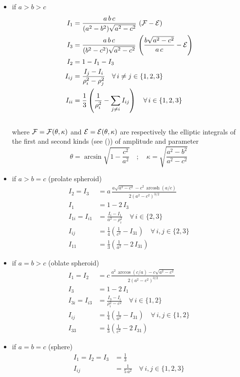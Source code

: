 \documentclass[
  a4paper,
  numbers=noendperiod,
  DIV=12]{scrreprt}
\providecommand{\tightlist}{%
  \setlength{\itemsep}{0pt}\setlength{\parskip}{0pt}}\usepackage{longtable,booktabs,array}
\DeclareMathOperator{\arcosh}{arcosh}
\begin{document}
\begin{itemize}
\tightlist
\item
  if \(a > b > c\) \[\begin{aligned}
    I_1&=\frac{a\,b\,c}{(a^2-b^2)\sqrt{a^2-c^2}}\,
    \left({\cal F}-{\cal E}\right)\\
    I_3&=\frac{a\,b\,c}{(b^2-c^2)\sqrt{a^2-c^2}}\,
    \left(\frac{b\sqrt{a^2-c^2}}{a\,c}-
    {\cal E}\right)\\
    I_2&=1-I_1-I_3\\
    I_{ij}&=\frac{I_j-I_i}{\rho_i^2-\rho_j^2}\quad\forall\, i\neq j\in\{1,2,3\}\\
    I_{ii}&=\frac{1}{3}\left(
    \frac{1}{\rho_i^2}-
    \sum_{j\neq i}I_{ij} \right) 
    \quad\forall\, i\in\{1,2,3\}
    \end{aligned}\]\\
  where \({\cal F}={\cal F}(\theta,\kappa)\) and
  \({\cal E}={\cal E}(\theta,\kappa)\) are respectively the elliptic
  integrals of the first and second kinds (see
  ()) of
  amplitude and parameter \[
    \theta=\arcsin{\sqrt{1-\frac{c^2}{a^2}}}
    \quad;\quad
    \kappa=\sqrt{\frac{a^2-b^2}{a^2-c^2}}
    \]
\item
  if \(a > b = c\) (prolate spheroid) \[\begin{aligned}
    I_2=I_3&=a\,
    \frac{a\sqrt{a^2-c^2}-c^2\,\arcosh{(a/c)}}
    {2\left(a^2-c^2\right)^{3/2}}\\
    I_1&=1-2\,I_3\\
    I_{1i}=I_{i1}&=\frac{I_i-I_1}{a^2-\rho_i^2}\quad
    \forall\, i\in\{2,3\}\\
    I_{ij}&=\frac{1}{4}
    \left(\frac{1}{c^2}-I_{31} \right) 
    \quad\forall\, i,j\in\{2,3\}\\
    I_{11}&=\frac{1}{3}
    \left(\frac{1}{a^2}-2\,I_{31} \right)
    \end{aligned}\]
\item
  if \(a = b > c\) (oblate spheroid) \[\begin{aligned}
    I_1=I_2&=c\,
    \frac{a^2\,\arccos{(c/a)}-c\sqrt{a^2-c^2}}
    {2\left(a^2-c^2\right)^{3/2}}\\
    I_3&=1-2\,I_1\\
    I_{3i}=I_{i3}&=\frac{I_3-I_i}{\rho_i^2-c^2}\quad
    \forall\, i\in\{1,2\}\\
    I_{ij}&=\frac{1}{4}
    \left(\frac{1}{a^2}-I_{31} \right) 
    \quad\forall\, i,j\in\{1,2\}\\
    I_{33}&=\frac{1}{3}
    \left(\frac{1}{c^2}-2\,I_{31} \right)
    \end{aligned}\]
\item
  if \(a = b = c\) (sphere) \[\begin{aligned}
    I_1=I_2=I_3&=\frac{1}{3}\\
    I_{ij}&=\frac{1}{5\,a^2}\quad\forall\, i,j\in\{1,2,3\}
    \end{aligned}\]
\end{itemize}
\end{document}
